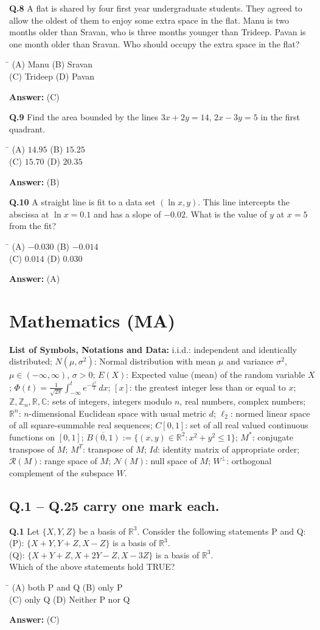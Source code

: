 \documentclass[11pt,a4paper]{article}
\newcommand{\optsfourA}[4]{%
  \begin{tabbing}
    \hspace{0.48\linewidth}\=\kill
    (A) #1 \> (B) #2 \\[2pt]
    (C) #3 \> (D) #4
  \end{tabbing}%
}
\newcommand{\ans}[1]{\textbf{Answer:} #1\par\medskip}
\begin{document}
\textbf{Q.8} A flat is shared by four first year undergraduate students. They agreed to allow the oldest of them to enjoy some extra space in the flat. Manu is two months older than Sravan, who is three months younger than Trideep. Pavan is one month older than Sravan. Who should occupy the extra space in the flat?
\optsfourA{Manu}{Sravan}{Trideep}{Pavan}
\ans{(C)}

\textbf{Q.9} Find the area bounded by the lines $3x + 2y = 14$, $2x - 3y = 5$ in the first quadrant.
\optsfourA{$14.95$}{$15.25$}{$15.70$}{$20.35$}
\ans{(B)}

\textbf{Q.10} A straight line is fit to a data set $(\ln x, y)$. This line intercepts the abscissa at $\ln x = 0.1$ and has a slope of $-0.02$. What is the value of $y$ at $x = 5$ from the fit?
\optsfourA{$-0.030$}{$-0.014$}{$0.014$}{$0.030$}
\ans{(A)}

\section*{Mathematics (MA)}

\textbf{List of Symbols, Notations and Data:}
i.i.d.: independent and identically distributed; $N(\mu,\sigma^2)$: Normal distribution with mean $\mu$ and variance $\sigma^2$, $\mu \in (-\infty,\infty)$, $\sigma > 0$; $E(X)$: Expected value (mean) of the random variable $X$; $\Phi(t) = \frac{1}{\sqrt{2\pi}} \int_{-\infty}^t e^{-\frac{x^2}{2}}\,dx$; $[x]$: the greatest integer less than or equal to $x$; $\mathbb{Z}, \mathbb{Z}_n, \mathbb{R}, \mathbb{C}$: sets of integers, integers modulo $n$, real numbers, complex numbers; $\mathbb{R}^n$: $n$-dimensional Euclidean space with usual metric $d$; $\ell_2$: normed linear space of all square-summable real sequences; $C[0,1]$: set of all real valued continuous functions on $[0,1]$; $\overline{B(0,1)} := \{(x,y) \in \mathbb{R}^2 : x^2 + y^2 \le 1\}$; $M^*$: conjugate transpose of $M$; $M^T$: transpose of $M$; $Id$: identity matrix of appropriate order; $\mathcal{R}(M)$: range space of $M$; $\mathcal{N}(M)$: null space of $M$; $W^\perp$: orthogonal complement of the subspace $W$.

\subsection*{Q.1 -- Q.25 carry one mark each.}

\textbf{Q.1} Let $\{X, Y, Z\}$ be a basis of $\mathbb{R}^3$. Consider the following statements P and Q:\\
(P): $\{X + Y, Y + Z, X - Z\}$ is a basis of $\mathbb{R}^3$.\\
(Q): $\{X + Y + Z, X + 2Y - Z, X - 3Z\}$ is a basis of $\mathbb{R}^3$.\\
Which of the above statements hold TRUE?
\optsfourA{both P and Q}{only P}{only Q}{Neither P nor Q}
\ans{(C)}
\end{document}
